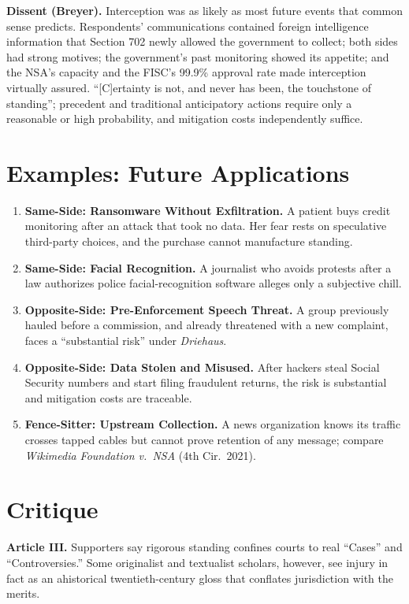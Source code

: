 \documentclass[12pt]{article}
\begin{document}
\textbf{Dissent (Breyer).} Interception was as likely as most future events that common sense predicts. Respondents' communications contained foreign intelligence information that Section 702 newly allowed the government to collect; both sides had strong motives; the government's past monitoring showed its appetite; and the NSA's capacity and the FISC's 99.9\% approval rate made interception virtually assured. ``[C]ertainty is not, and never has been, the touchstone of standing''; precedent and traditional anticipatory actions require only a reasonable or high probability, and mitigation costs independently suffice.

\section{Examples: Future Applications}

\begin{enumerate}
\item \textbf{Same-Side: Ransomware Without Exfiltration.} A patient buys credit monitoring after an attack that took no data. Her fear rests on speculative third-party choices, and the purchase cannot manufacture standing.
\item \textbf{Same-Side: Facial Recognition.} A journalist who avoids protests after a law authorizes police facial-recognition software alleges only a subjective chill.
\item \textbf{Opposite-Side: Pre-Enforcement Speech Threat.} A group previously hauled before a commission, and already threatened with a new complaint, faces a ``substantial risk'' under \textit{Driehaus}.
\item \textbf{Opposite-Side: Data Stolen and Misused.} After hackers steal Social Security numbers and start filing fraudulent returns, the risk is substantial and mitigation costs are traceable.
\item \textbf{Fence-Sitter: Upstream Collection.} A news organization knows its traffic crosses tapped cables but cannot prove retention of any message; compare \textit{Wikimedia Foundation v.\ NSA} (4th Cir.\ 2021).
\end{enumerate}

\section{Critique}

\textbf{Article III.} Supporters say rigorous standing confines courts to real ``Cases'' and ``Controversies.'' Some originalist and textualist scholars, however, see injury in fact as an ahistorical twentieth-century gloss that conflates jurisdiction with the merits.
\end{document}
